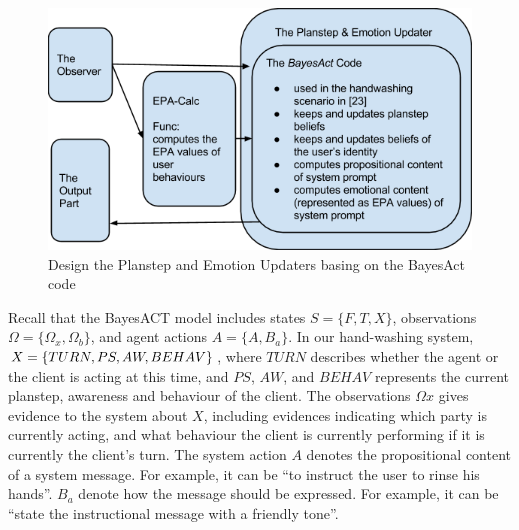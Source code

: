 \begin{figure}[h!]
\centering
\includegraphics[width=0.8\linewidth]{fig/updater.png}
\caption{Design the Planstep and Emotion Updaters basing on the BayesAct code}
\label{fig:updater}
\end{figure}

Recall that the BayesACT model includes states $S = \{F, T, X\}$, observations $\Omega = \{\Omega_{x}, \Omega_{b}\}$, and agent actions $A = \{A, B_{a}\}$. In our hand-washing system, $X = \{TURN, PS, \\ AW, BEHAV\}$, where $TURN$ describes whether the agent or the client is acting at this time, and $PS$, $AW$, and $BEHAV$ represents the current planstep, awareness and behaviour of the client. The observations $\Omega{x}$ gives evidence to the system about $X$, including evidences indicating which party is currently acting, and what behaviour the client is currently performing if it is currently the client's turn. The system action $A$ denotes the propositional content of a system message. For example, it can be ``to instruct the user to rinse his hands''. $B_{a}$ denote how the message should be expressed. For example, it can be ``state the instructional message with a friendly tone''.

